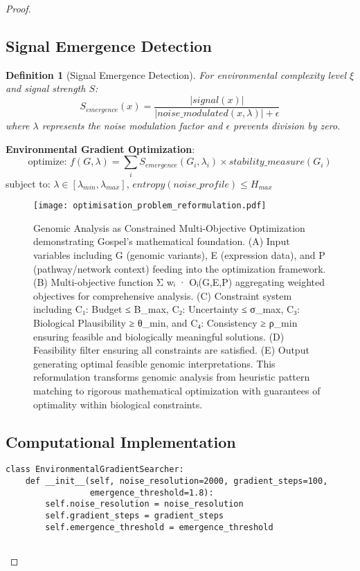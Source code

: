 \documentclass[12pt,a4paper]{article}
\newtheorem{definition}[theorem]{Definition}
\begin{document}
\begin{proof}
\subsection{Signal Emergence Detection}

\begin{definition}[Signal Emergence Detection]
For environmental complexity level $\xi$ and signal strength $S$:
\begin{equation}
S_{emergence}(x) = \frac{|signal(x)|}{|noise\_modulated(x, \lambda)| + \epsilon}
\end{equation}
where $\lambda$ represents the noise modulation factor and $\epsilon$ prevents division by zero.
\end{definition}

\textbf{Environmental Gradient Optimization}:
\begin{equation}
\text{optimize: } f(G, \lambda) = \sum_i S_{emergence}(G_i, \lambda_i) \times stability\_measure(G_i)
\end{equation}
subject to: $\lambda \in [\lambda_{min}, \lambda_{max}]$, $entropy(noise\_profile) \leq H_{max}$

\begin{figure}[H]
\centering
\texttt{[image: optimisation\_problem\_reformulation.pdf]}
\caption{Genomic Analysis as Constrained Multi-Objective Optimization demonstrating Gospel's mathematical foundation. (A) Input variables including G (genomic variants), E (expression data), and P (pathway/network context) feeding into the optimization framework. (B) Multi-objective function Σ wᵢ · Oᵢ(G,E,P) aggregating weighted objectives for comprehensive analysis. (C) Constraint system including C₁: Budget ≤ B\_max, C₂: Uncertainty ≤ σ\_max, C₃: Biological Plausibility ≥ θ\_min, and C₄: Consistency ≥ ρ\_min ensuring feasible and biologically meaningful solutions. (D) Feasibility filter ensuring all constraints are satisfied. (E) Output generating optimal feasible genomic interpretations. This reformulation transforms genomic analysis from heuristic pattern matching to rigorous mathematical optimization with guarantees of optimality within biological constraints.}
\label{fig:optimization-reformulation}
\end{figure}

\subsection{Computational Implementation}

\begin{lstlisting}[style=pythonstyle, caption=Environmental Gradient Search Implementation]
class EnvironmentalGradientSearcher:
    def __init__(self, noise_resolution=2000, gradient_steps=100, 
                 emergence_threshold=1.8):
        self.noise_resolution = noise_resolution
        self.gradient_steps = gradient_steps  
        self.emergence_threshold = emergence_threshold
        

\end{lstlisting}
\end{proof}
\end{document}
